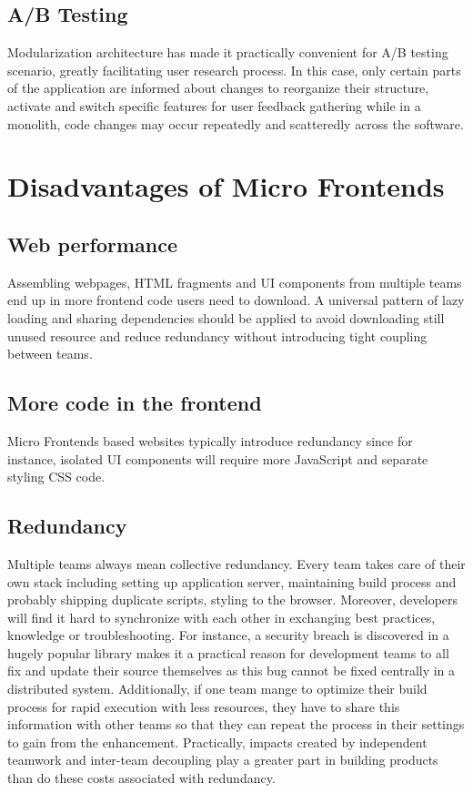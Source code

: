 \documentclass[a4paper]{book}
\begin{document}
\subsection{A/B Testing}
Modularization architecture has made it practically convenient for A/B testing scenario, greatly facilitating  user research process. In this case, only certain parts of the application are informed about changes to reorganize their structure, activate and switch specific features for user feedback gathering while in a monolith, code changes may occur repeatedly and scatteredly across the software. \cite{Rap20}

\section{Disadvantages of Micro Frontends}

\subsection{Web performance}
 
Assembling webpages, HTML fragments and UI components from multiple teams end up in more frontend code users need to download. A universal pattern of lazy loading and sharing dependencies should be applied to avoid downloading still unused resource and reduce redundancy without introducing tight coupling between teams. 

\subsection{More code in the frontend}

Micro Frontends based websites typically introduce redundancy since for instance, isolated UI components will require more JavaScript and separate styling CSS code.

\subsection{Redundancy}

Multiple teams always mean collective redundancy. Every team takes care of their own stack including setting up application server, maintaining build process and probably shipping duplicate scripts, styling to the browser. Moreover, developers will find it hard to synchronize with each other in exchanging best practices, knowledge or troubleshooting. For instance, a security breach is discovered in a hugely popular library makes it a practical reason for development teams to all fix and update their source themselves as this bug cannot be fixed centrally in a distributed system. Additionally, if one team mange to optimize their build process for rapid execution with less resources, they have to share this information with other teams so that they can repeat the process in their settings to gain from the enhancement. Practically, impacts created by independent teamwork and inter-team decoupling play a greater part in building products than do these costs associated with redundancy.
\end{document}
